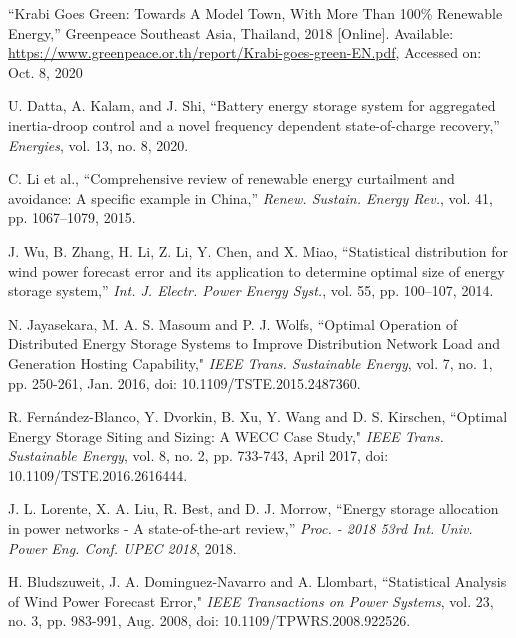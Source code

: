 \begin{thebibliography}{00}

 ``Krabi Goes Green: Towards A Model Town, With More Than 100\% Renewable Energy,'' Greenpeace Southeast Asia, Thailand, 2018 [Online]. 
Available: \underline{https://www.greenpeace.or.th/report/Krabi-goes-green-EN.pdf}, Accessed on: Oct. 8, 2020


 U. Datta, A. Kalam, and J. Shi, “Battery energy storage system for aggregated inertia-droop control and a novel frequency dependent state-of-charge recovery,” \emph{Energies}, vol. 13, no. 8, 2020.

 C. Li et al., “Comprehensive review of renewable energy curtailment and avoidance: A specific example in China,” \emph{Renew. Sustain. Energy Rev.}, vol. 41, pp. 1067–1079, 2015.

 J. Wu, B. Zhang, H. Li, Z. Li, Y. Chen, and X. Miao, “Statistical distribution for wind power forecast error and its application to determine optimal size of energy storage system,” \emph{Int. J. Electr. Power Energy Syst.}, vol. 55, pp. 100–107, 2014.

N. Jayasekara, M. A. S. Masoum and P. J. Wolfs, ``Optimal Operation of Distributed Energy Storage Systems to Improve Distribution Network Load and Generation Hosting Capability," \emph{IEEE Trans. Sustainable Energy}, vol. 7, no. 1, pp. 250-261, Jan. 2016, doi: 10.1109/TSTE.2015.2487360.


R. Fernández-Blanco, Y. Dvorkin, B. Xu, Y. Wang and D. S. Kirschen, ``Optimal Energy Storage Siting and Sizing: A WECC Case Study," \emph{IEEE Trans. Sustainable Energy}, vol. 8, no. 2, pp. 733-743, April 2017, doi: 10.1109/TSTE.2016.2616444.



J. L. Lorente, X. A. Liu, R. Best, and D. J. Morrow, “Energy storage allocation in power networks - A state-of-the-art review,” \emph{Proc. - 2018 53rd Int. Univ. Power Eng. Conf. UPEC 2018}, 2018.

H. Bludszuweit, J. A. Dominguez-Navarro and A. Llombart, ``Statistical Analysis of Wind Power Forecast Error," \emph{IEEE Transactions on Power Systems}, vol. 23, no. 3, pp. 983-991, Aug. 2008, doi: 10.1109/TPWRS.2008.922526.

\end{thebibliography}